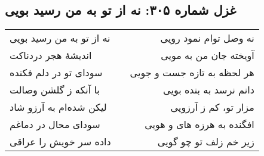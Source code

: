 \begin{center}
\section*{غزل شماره ۳۰۵: نه از تو به من رسید بویی}
\label{sec:305}
\begin{longtable}{l p{0.5cm} r}
نه از تو به من رسید بویی
&&
نه وصل توام نمود رویی
\\
اندیشهٔ هجر دردناکت
&&
آویخته جان من به مویی
\\
سودای تو در دلم فکنده
&&
هر لحظه به تازه جست و جویی
\\
با آنکه ز گلشن وصالت
&&
دانم نرسد به بنده بویی
\\
لیکن شده‌ام به آرزو شاد
&&
مزار تو، کم ز آرزویی
\\
سودای محال در دماغم
&&
افگنده به هرزه های و هویی
\\
داده سر خویش را عراقی
&&
زیر خم زلف تو چو گویی
\\
\end{longtable}
\end{center}
